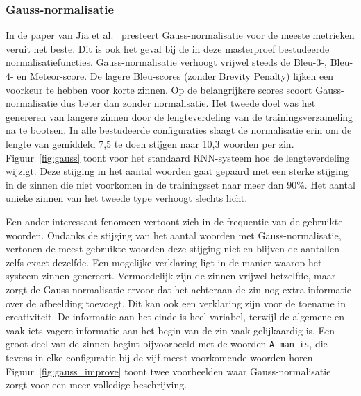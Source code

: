 \subsubsection{Gauss-normalisatie}
In de paper van Jia et al.~\cite{Fernando2015} presteert Gauss-normalisatie voor de meeste metrieken veruit het beste. 
Dit is ook het geval bij de in deze masterproef bestudeerde normalisatiefuncties. Gauss-normalisatie verhoogt vrijwel steeds de Bleu-3-, Bleu-4- en Meteor-score. De lagere Bleu-scores (zonder Brevity Penalty) lijken een voorkeur te hebben voor korte zinnen. Op de belangrijkere scores scoort Gauss-normalisatie dus beter dan zonder normalisatie. 
Het tweede doel was het genereren van langere zinnen door de lengteverdeling van de trainingsverzameling na te bootsen.
In alle bestudeerde configuraties slaagt de normalisatie erin om de lengte van gemiddeld 7,5 te doen stijgen naar 10,3 woorden per zin. Figuur~\ref{fig:gauss} toont voor het standaard RNN-systeem hoe de lengteverdeling wijzigt. Deze stijging in het aantal woorden gaat gepaard met een sterke stijging in de zinnen die niet voorkomen in de trainingsset naar meer dan 90\%. Het aantal unieke zinnen van het tweede type verhoogt slechts licht. 

Een ander interessant fenomeen vertoont zich in de frequentie van de gebruikte woorden. Ondanks de stijging van het aantal woorden met Gauss-normalisatie, vertonen de meest gebruikte woorden deze stijging niet en blijven de aantallen zelfs exact dezelfde. Een mogelijke verklaring ligt in de manier waarop het systeem zinnen genereert. Vermoedelijk zijn de zinnen vrijwel hetzelfde, maar zorgt de Gauss-normalisatie ervoor dat het achteraan de zin nog extra informatie over de afbeelding toevoegt. Dit kan ook een verklaring zijn voor de toename in creativiteit. De informatie aan het einde is heel variabel, terwijl de algemene en vaak iets vagere informatie aan het begin van de zin vaak gelijkaardig is. Een groot deel van de zinnen begint bijvoorbeeld met de woorden \texttt{A man is}, die tevens in elke configuratie bij de vijf meest voorkomende woorden horen. Figuur~\ref{fig:gauss_improve} toont twee voorbeelden waar Gauss-normalisatie zorgt voor een meer volledige beschrijving.

